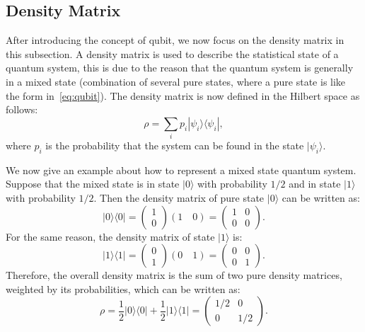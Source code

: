 \subsection{Density Matrix}
After introducing the concept of qubit, we now focus on the density matrix in this subsection.
A density matrix is used to describe the statistical state of a quantum system, this is due to the reason that the quantum system is generally in a mixed state (combination of several pure states, where a pure state is like the form in~\eqref{eq:qubit}).
The density matrix is now defined in the Hilbert space as follows:
\begin{equation}\label{eq:densityMatrix}
\rho = \underset{i}{\sum} p_i |\psi_i\rangle \langle \psi_i|,
\end{equation}
where $p_i$ is the probability that the system can be found in the state $|\psi_i \rangle$.

We now give an example about how to represent a mixed state quantum system.
Suppose that the mixed state is in state $|0 \rangle$ with probability $1/2$ and in state $|1 \rangle$ with probability $1/2$.
Then the density matrix of pure state $|0\rangle$ can be written as:
\begin{equation}
  |0 \rangle \langle 0| =
  \begin{pmatrix}
  1 \\
  0
  \end{pmatrix}
  \left( 1 \quad 0 \right) = 
  \begin{pmatrix}
  1 &0 \\
  0 &0 
  \end{pmatrix}.
\end{equation}
For the same reason, the density matrix of state $|1\rangle$ is:
\begin{equation}
  |1 \rangle \langle 1| =
  \begin{pmatrix}
  0 \\
  1
  \end{pmatrix}
  \left( 0 \quad 1 \right) = 
  \begin{pmatrix}
  0 &0 \\
  0 &1 
  \end{pmatrix}.
\end{equation}
Therefore, the overall density matrix is the sum of two pure density matrices, weighted by its probabilities, which can be written as:
\begin{equation*}
  \rho = \frac{1}{2}|0 \rangle \langle 0| + \frac{1}{2}|1 \rangle \langle 1| =
  \begin{pmatrix}
  1/2 &0 \\
  0 &1/2 
  \end{pmatrix}.
\end{equation*}
